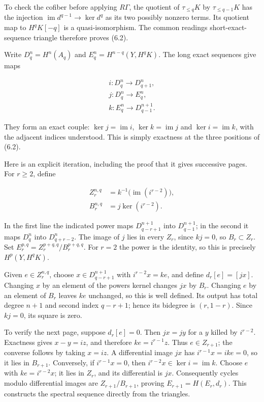 \documentclass[
  english,
  11pt,
  a4paper,
]{article}
\begin{document}
To check the cofiber before applying \(R\Gamma\), the quotient of
\(\tau_{\le q}K\) by \(\tau_{\le q-1}K\) has the injection
\(\operatorname{im}d^{q-1}\to\ker d^q\) as its two possibly nonzero
terms. Its quotient map to \(H^qK[-q]\) is a quasi-isomorphism. The
common reading\textquotesingle s short-exact-sequence triangle therefore
proves (6.2).

Write \(D_q^n=H^n(A_q)\) and \(E_q^n=H^{n-q}(Y,H^qK)\). The long exact
sequences give maps

\[\begin{gathered}
i:D_q^n\longrightarrow D_{q+1}^n,\\
j:D_q^n\longrightarrow E_q^n,\\
k:E_q^n\longrightarrow D_{q-1}^{n+1}.
\end{gathered}
\tag{6.3}\]

They form an exact couple: \(\ker j=\operatorname{im}i\),
\(\ker k=\operatorname{im}j\) and \(\ker i=\operatorname{im}k\), with
the adjacent indices understood. This is simply exactness at the three
positions of (6.2).

Here is an explicit iteration, including the proof that it gives
successive pages. For \(r\ge2\), define

\[\begin{aligned}
Z_r^{n,q}&=k^{-1}\bigl(\operatorname{im}(i^{r-2})\bigr),\\
B_r^{n,q}&=j\ker(i^{r-2}).
\end{aligned}
\tag{6.4}\]

In the first line the indicated power maps \(D_{q-r+1}^{n+1}\) into
\(D_{q-1}^{n+1}\); in the second it maps \(D_q^n\) into \(D_{q+r-2}^n\).
The image of \(j\) lies in every \(Z_r\), since \(kj=0\), so
\(B_r\subset Z_r\). Set \(E_r^{p,q}=Z_r^{p+q,q}/B_r^{p+q,q}\). For
\(r=2\) the power is the identity, so this is precisely \(H^p(Y,H^qK)\).

Given \(e\in Z_r^{n,q}\), choose \(x\in D_{q-r+1}^{n+1}\) with
\(i^{r-2}x=k e\), and define \(d_r[e]=[jx]\). Changing \(x\) by an
element of the power\textquotesingle s kernel changes \(jx\) by \(B_r\).
Changing \(e\) by an element of \(B_r\) leaves \(ke\) unchanged, so this
is well defined. Its output has total degree \(n+1\) and second index
\(q-r+1\); hence its bidegree is \((r,1-r)\). Since \(kj=0\), its square
is zero.

To verify the next page, suppose \(d_r[e]=0\). Then \(jx=jy\) for a
\(y\) killed by \(i^{r-2}\). Exactness gives \(x-y=iz\), and therefore
\(ke=i^{r-1}z\). Thus \(e\in Z_{r+1}\); the converse follows by taking
\(x=iz\). A differential image \(jx\) has \(i^{r-1}x=i k e=0\), so it
lies in \(B_{r+1}\). Conversely, if \(i^{r-1}x=0\), then
\(i^{r-2}x\in\ker i=\operatorname{im}k\). Choose \(e\) with
\(ke=i^{r-2}x\); it lies in \(Z_r\), and its differential is \(jx\).
Consequently cycles modulo differential images are \(Z_{r+1}/B_{r+1}\),
proving \(E_{r+1}=H(E_r,d_r)\). This constructs the spectral sequence
directly from the triangles.
\end{document}
